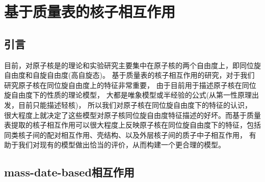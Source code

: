 \chapter{基于质量表的核子相互作用}
\section{引言}
目前，对原子核是的理论和实验研究主要集中在原子核的两个自由度上，即同位旋自由度和自旋自由度(高自旋态)。 基于质量表的核子相互作用的研究，对于我们研究原子核在同位旋自由度上的特征非常重要， 由于目前用于描述原子核在同位旋自由度下的性质的理论模型， 大都是唯象模型或半经验的公式(从第一性原理出发，目前只能描述轻核)， 所以我们对原子核在同位旋自由度下的特征的认识，   很大程度上就决定了这些模型对原子核同位旋自由度特征描述的好坏。而基于质量表提取的核子相互作用可以很大程度上反映原子核在同位旋自由度下的特征，包括同类核子间的配对相互作用、壳结构、以及外层核子间的质子中子相互作用， 有助于我们对现有的模型做出恰当的评价，从而构建一个更合理的模型。
\section{mass-date-based相互作用}

